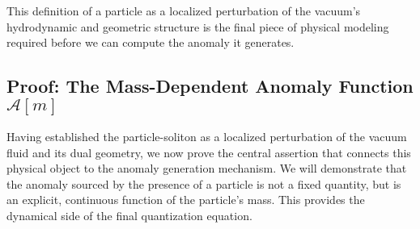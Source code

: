 \documentclass[11pt, letterpaper]{report}
\theoremstyle{plain} %
\theoremstyle{definition} %
\theoremstyle{remark} %
\begin{document}
This definition of a particle as a localized perturbation of the vacuum's hydrodynamic and geometric structure is the final piece of physical modeling required before we can compute the anomaly it generates.



\subsection{Proof: The Mass-Dependent Anomaly Function \texorpdfstring{$\mathcal{A}[m]$}{A[m]}}
\label{subsec:mass_dependent_anomaly}

Having established the particle-soliton as a localized perturbation of the vacuum fluid and its dual geometry, we now prove the central assertion that connects this physical object to the anomaly generation mechanism. We will demonstrate that the anomaly sourced by the presence of a particle is not a fixed quantity, but is an explicit, continuous function of the particle's mass. This provides the dynamical side of the final quantization equation.
\end{document}
